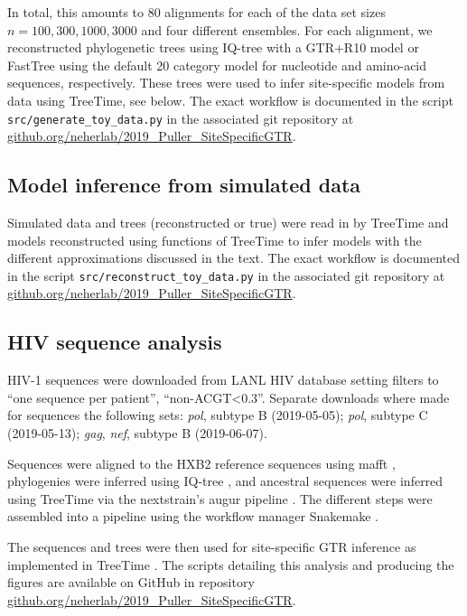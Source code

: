 \documentclass[aps,rmp,twocolumn,linenumbers]{revtex4-1}
\newcommand{\gene}[1]{{\it #1}}
\begin{document}
In total, this amounts to 80 alignments for each of the data set sizes $n=100,300,1000,3000$ and four different ensembles.
For each alignment, we reconstructed phylogenetic trees using IQ-tree \citep{nguyen_iq-tree:_2015} with a GTR+R10 model or FastTree \citep{FastTree} using the default 20 category model for nucleotide and amino-acid sequences, respectively.
These trees were used to infer site-specific models from data using TreeTime, see below.
The exact workflow is documented in the script \texttt{src/generate\_toy\_data.py} in the associated git repository at \href{https://github.com/neherlab/2019_Puller_SiteSpecificGTR}{github.org/neherlab/2019\_Puller\_SiteSpecificGTR}.

\subsection*{Model inference from simulated data}
Simulated data and trees (reconstructed or true) were read in by TreeTime and models reconstructed using functions of TreeTime to infer models with the different approximations discussed in the text.
The exact workflow is documented in the script \texttt{src/reconstruct\_toy\_data.py} in the associated git repository at \href{https://github.com/neherlab/2019_Puller_SiteSpecificGTR}{github.org/neherlab/2019\_Puller\_SiteSpecificGTR}.

\subsection*{HIV sequence analysis}
HIV-1 sequences were downloaded from LANL HIV database \citep{LANL} setting filters to ``one sequence per patient'', ``non-ACGT\textless 0.3''.
Separate downloads where made for sequences the following sets: \gene{pol}, subtype B (2019-05-05); \gene{pol}, subtype C (2019-05-13); \gene{gag}, \gene{nef}, subtype B (2019-06-07).

Sequences were aligned to the HXB2 reference sequences using mafft \citep{katoh2013mafft}, phylogenies were inferred using IQ-tree \citep{nguyen_iq-tree:_2015}, and ancestral sequences were inferred using TreeTime \citep{sagulenko2017treetime} via the nextstrain's augur pipeline \citep{hadfield_nextstrain:_2018}.
The different steps were assembled into a pipeline using the workflow manager Snakemake \citep{koster_snakemakescalable_2012}.

The sequences and trees were then used for site-specific GTR inference as implemented in TreeTime \citep{sagulenko2017treetime}.
The scripts detailing this analysis and producing the figures are available on GitHub in repository \href{https://github.com/neherlab/2019_Puller_SiteSpecificGTR}{github.org/neherlab/2019\_Puller\_SiteSpecificGTR}.
\end{document}

